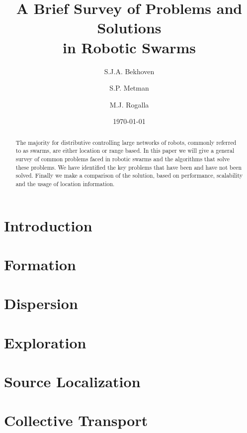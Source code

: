\documentclass[a4paper]{article}
\title{A Brief Survey of Problems and Solutions \\ in Robotic Swarms}
\author{S.J.A. Bekhoven  \and
    S.P. Metman \and
    M.J. Rogalla}
\date{\today}
\begin{document}
\maketitle

\begin{abstract}
The majority for distributive controlling large networks of robots, commonly referred to as swarms, are either location or range based.
In this paper we will give a general survey of common problems faced in robotic swarms and the algorithms that solve these problems.
We have identified the key problems that have been and have not been solved. Finally we make a comparison of the solution, based on performance, scalability and the usage of location information.
\end{abstract}


\section{Introduction}
  

\section{Formation}
  \label{sec:Formation}
  

\section{Dispersion}
  \label{sec:Dispersion}
  

\section{Exploration}
  \label{sec:Exploration}
  
 
\section{Source Localization}
  \label{sec:Localization}
  

\section{Collective Transport}
  \label{sec:CollectiveTransport}
  
  
\end{document}
